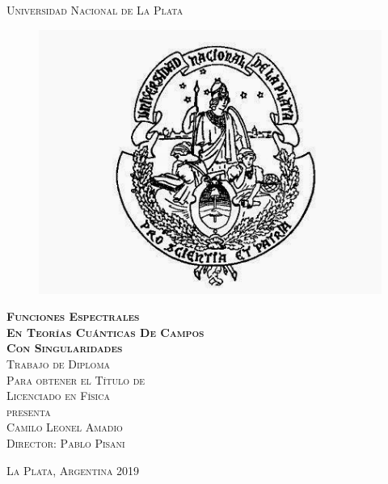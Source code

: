 \documentclass[11pt]{book}
\begin{document}
\begin{titlepage}
\begin{center}

\textsc{\Large Universidad Nacional de La Plata}\\[4em]

\begin{figure}[h]
\begin{center}
\includegraphics[width=5 cm]{Escudo.jpg}
\end{center}
\end{figure}

\vspace{1em}

\textsc{\huge \textbf{
Funciones Espectrales \\[2mm]
En Teorías Cuánticas De Campos \\[2mm]
Con Singularidades
}}\\[4em]

\textsc{\large Trabajo de Diploma}\\[1em]

\textsc{Para obtener el Título de }\\[1em]

\textsc{Licenciado en Física}\\[1em]

\textsc{presenta}\\[1em]

\textsc{\Large Camilo Leonel Amadio}\\[1em]

\textsc{\large Director: Pablo Pisani}

\end{center}

\vspace*{\fill}
\textsc{La Plata, Argentina \hspace*{\fill} 2019}

\end{titlepage}
\end{document}
